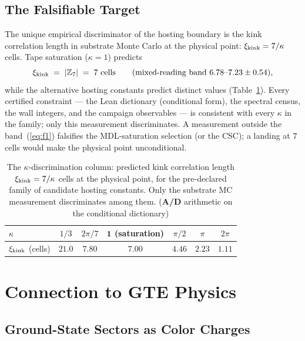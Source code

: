\documentclass[11pt]{article}
\theoremstyle{remark}
\newcommand{\CatAD}{\textbf{A/D}}
\begin{document}
\subsection{The Falsifiable Target}
\label{sec:f1}

The unique empirical discriminator of the hosting boundary is the kink
correlation length in substrate Monte Carlo at the physical point:
$\xi_{\rm kink} = 7/\kappa$ cells. Tape saturation ($\kappa = 1$) predicts
\begin{equation}\label{eq:f1}
  \xi_{\rm kink} \;=\; |\mathbb{Z}_7| \;=\; 7 \text{ cells}
  \qquad (\text{mixed-reading band } 6.78\text{--}7.23 \pm 0.54),
\end{equation}
while the alternative hosting constants predict distinct values
(Table~\ref{tab:kappa}). Every certified constraint --- the Lean dictionary
(conditional form), the spectral census, the wall integers, and the campaign
observables --- is consistent with every $\kappa$ in the family; only this
measurement discriminates. A measurement outside the
band~(\ref{eq:f1}) falsifies the MDL-saturation selection (or the CSC); a
landing at $7$ cells would make the physical point unconditional.

\begin{table}[htb]
\centering
\caption{The $\kappa$-discrimination column: predicted kink correlation
length $\xi_{\rm kink} = 7/\kappa$ cells at the physical point, for the
pre-declared family of candidate hosting constants. Only the substrate MC
measurement discriminates among them. (\CatAD{} arithmetic on the conditional
dictionary)}
\label{tab:kappa}
\begin{tabular}{@{}lcccccc@{}}
\toprule
$\kappa$ & $1/3$ & $2\pi/7$ & $\mathbf{1}$ (saturation) & $\pi/2$ & $\pi$ & $2\pi$ \\
\midrule
$\xi_{\rm kink}$ (cells) & $21.0$ & $7.80$ & $\mathbf{7.00}$ & $4.46$ & $2.23$ & $1.11$ \\
\bottomrule
\end{tabular}
\end{table}

\section{Connection to GTE Physics}
\label{sec:gte}

\subsection{Ground-State Sectors as Color Charges}
\end{document}
